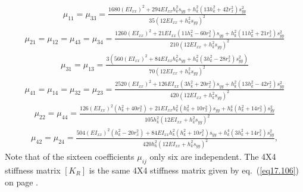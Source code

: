 \documentclass{AeroStructure-ERJohnson}
\begin{document}
\begin{align}\label{eq18.168}
\mu_{11}=\mu_{33}=\frac{1680\left(E I_{x x}\right)^{2}+294 E I_{x x} h_{k}^{2} s_{y y}+h_{k}^{2}\left(13 h_{k}^{2}+42 r_{x}^{2}\right) s_{y y}^{2}}{35\left(12 E I_{x x}+h_{k}^{2} s_{y y}\right)^{2}}
\end{align}\begin{align}\label{eq18.169}
\mu_{21}=\mu_{12}=\mu_{43}=\mu_{34}=\frac{1260\left(E I_{x x}\right)^{2}+21 E I_{x x}\left(11 h_{k}^{2}-60 r_{x}^{2}\right) s_{y y}+h_{k}^{2}\left(11 h_{k}^{2}+21 r_{x}^{2}\right) s_{y y}^{2}}{210\left(12 E I_{x x}+h_{k}^{2} s_{y y}\right)^{2}}
\end{align}\begin{align}\label{eq18.170}
\mu_{31}=\mu_{13}=\frac{3\left(560\left(E I_{x x}\right)^{2}+84 E I_{x x} h_{k}^{2} s_{y y}+h_{k}^{2}\left(3 h_{k}^{2}-28 r_{x}^{2}\right) s_{y y}^{2}\right)}{70\left(12 E I_{x x}+h_{k}^{2} s_{y y}\right)^{2}}
\end{align}\begin{align}\label{eq18.171}
\mu_{41}=\mu_{14}=\mu_{32}=\mu_{23}=\frac{2520\left(E I_{x x}\right)^{2}+126 E I_{x x}\left(3 h_{k}^{2}+20 r_{x}^{2}\right) s_{y y}+h_{k}^{2}\left(13 h_{k}^{2}-42 r_{x}^{2}\right) s_{y y}^{2}}{420\left(12 E I_{x x}+h_{k}^{2} s_{y y}\right)^{2}}
\end{align}\begin{align}\label{eq18.172}
\mu_{22}=\mu_{44}=\frac{126\left(E I_{x x}\right)^{2}\left(h_{k}^{2}+40 r_{x}^{2}\right)+21 E I_{x x} h_{k}^{2}\left(h_{k}^{2}+10 r_{x}^{2}\right) s_{y y}+h_{k}^{4}\left(h_{k}^{2}+14 r_{x}^{2}\right) s_{y y}^{2}}{105 h_{k}^{2}\left(12 E I_{x x}+h_{k}^{2} s_{y y}\right)^{2}}
\end{align}\begin{align}\label{eq18.173}
\mu_{42}=\mu_{24}=\frac{504\left(E I_{x x}\right)^{2}\left(h_{k}^{2}-20 r_{x}^{2}\right)+84 E I_{x x} h_{k}^{2}\left(h_{k}^{2}+10 r_{x}^{2}\right) s_{y y}+h_{k}^{4}\left(3 h_{k}^{2}+14 r_{x}^{2}\right) s_{y y}^{2}}{420 h_{k}^{2}\left(12 E I_{x x}+h_{k}^{2} s_{y y}\right)^{2}},
\end{align}
Note that of the sixteen coefficients $\mu_{i j}$ only six are independent. The 4X4 stiffness matrix $\left[K_{R}\right]$ is the same 4X4 stiffness matrix given by eq.~(\ref{eq17.106}) on page \pageref{eq17.106}.
\end{document}
